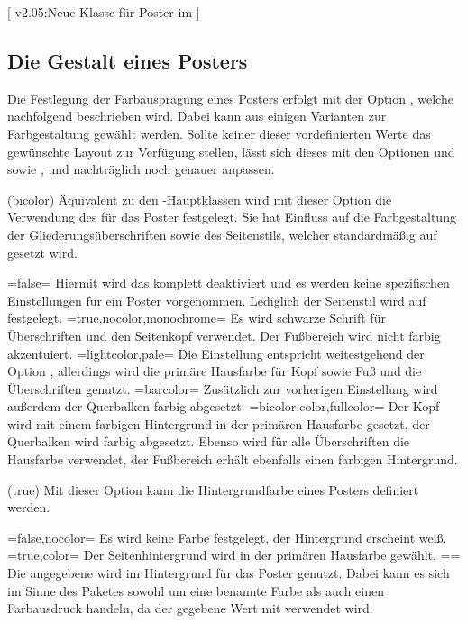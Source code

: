 \begin{DeclareEntity}{}[%
  v2.05:Neue Klasse für Poster im \TUDCD%
]
\subsection{Die Gestalt eines Posters}
%
Die Festlegung der Farbausprägung eines Posters erfolgt mit der Option 
, welche nachfolgend beschrieben wird. Dabei kann aus einigen 
Varianten zur Farbgestaltung gewählt werden. Sollte keiner dieser 
vordefinierten Werte das gewünschte Layout zur Verfügung stellen, lässt sich 
dieses mit den Optionen  und  sowie 
,  und  nachträglich 
noch genauer anpassen.


\begin{Declaration}
  {}
  (bicolor)
%
Äquivalent zu den \TUDScript-Hauptklassen wird mit dieser Option die Verwendung 
des \TUDCDs für das Poster festgelegt. Sie hat Einfluss auf die Farbgestaltung 
der Gliederungsüberschriften sowie des Seitenstils, welcher standardmäßig auf 
 gesetzt wird.
\begin{DeclareValues}
\itemval=false=
  Hiermit wird das \CD komplett deaktiviert und es werden keine spezifischen 
  Einstellungen für ein Poster vorgenommen. Lediglich der Seitenstil wird auf 
   festgelegt.
\itemval*=true,nocolor,monochrome=
  Es wird schwarze Schrift für Überschriften und den Seitenkopf verwendet. Der 
  Fußbereich wird nicht farbig akzentuiert.
\itemval=lightcolor,pale=
  Die Einstellung entspricht weitestgehend der Option , 
  allerdings wird die primäre Hausfarbe  für Kopf sowie Fuß und 
  die Überschriften genutzt.
\itemval=barcolor=
  Zusätzlich zur vorherigen Einstellung wird außerdem der Querbalken farbig 
  abgesetzt.
\itemval=bicolor,color,fullcolor=
  Der Kopf wird mit einem farbigen Hintergrund in der primären Hausfarbe 
   gesetzt, der Querbalken wird farbig abgesetzt. Ebenso wird für 
  alle Überschriften die Hausfarbe verwendet, der Fußbereich erhält ebenfalls 
  einen farbigen Hintergrund.
\end{DeclareValues}
\end{Declaration}

\begin{Declaration}
  {}
  (true)
%
Mit dieser Option kann die Hintergrundfarbe eines Posters definiert werden.
\begin{DeclareValues}
\itemval=false,nocolor=
  Es wird keine Farbe festgelegt, der Hintergrund erscheint weiß.
\itemval*=true,color=
  Der Seitenhintergrund wird in der primären Hausfarbe  gewählt.
\itemval==
  Die angegebene  wird im Hintergrund für das Poster genutzt. 
  Dabei kann es sich im Sinne des Paketes  sowohl um eine 
  benannte Farbe als auch einen Farbausdruck handeln, da der gegebene Wert mit 
   verwendet wird.
\end{DeclareValues}
\end{Declaration}


\end{DeclareEntity}
